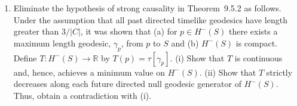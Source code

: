 \begin{enumerate}[label=\arabic*.,leftmargin=*]
\item Eliminate the hypothesis of strong causality in Theorem~9.5.2 as follows.
Under the assumption that all past directed timelike geodesics have length greater
than \(3/\lvert C\rvert\), it was shown that (a) for \(p\in H^-(S)\) there exists a
maximum length geodesic, \(\gamma_p\), from \(p\) to \(S\) and (b) \(H^-(S)\) is
compact. Define \(T:H^-(S)\longrightarrow\mathbb R\) by
\(T(p)=\tau[\gamma_p]\). (i) Show that \(T\) is continuous and, hence, achieves a
minimum value on \(H^-(S)\). (ii) Show that \(T\) strictly decreases along each
future directed null geodesic generator of \(H^-(S)\). Thus, obtain a contradiction
with (i).
\end{enumerate}

\setcounter{footnote}{\chapterninepreviousfootnote}
\endgroup
